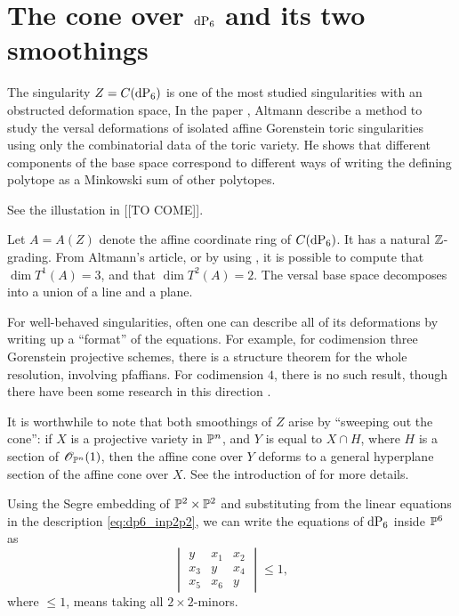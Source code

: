 \section{The cone over \texorpdfstring{$\dP6$}{dP6} and its two smoothings}

The singularity $Z=C(\dP6)$ is one of the most studied singularities with an obstructed deformation space, In the paper \cite{altmann_versaldeformation}, Altmann describe a method to study the versal deformations of isolated affine Gorenstein toric singularities using only the combinatorial data of the toric variety. He shows that different components of the base space correspond to different ways of writing the defining polytope as a Minkowski sum of other polytopes.

See the illustation in [[TO COME]].


Let $A=A(Z)$ denote the affine coordinate ring of $C(\dP6)$. It has a natural $\Z$-grading. From Altmann's article, or by using \MM, it is possible to compute that $\dim T^1(A)=3$, and that $\dim T^2(A)=2$. The versal base space decomposes into a union of a line and a plane.

For well-behaved singularities, often one can describe all of its deformations by writing up a ``format'' of the equations. For example, for codimension three Gorenstein projective schemes, there is a structure theorem for the whole resolution, involving pfaffians. For codimension $4$, there is no such result, though there have been some research in this direction .

It is worthwhile to note that both smoothings of $Z$ arise by ``sweeping out the cone'': if $X$ is a projective variety in $\P^n$, and $Y$ is equal to $X \cap H$, where $H$ is a section of $\OO_{\P^n}(1)$, then the affine cone over $Y$ deforms to a general hyperplane section of the affine cone over $X$. See the introduction of \cite{stevens_deformations} for more details.

Using the Segre embedding of $\P^2 \times \P^2$ and substituting from the linear equations in the description \cref{eq:dp6_inp2p2}, we can write the equations of $\dP6$ inside $\P^6$ as
\begin{equation}
\begin{vmatrix}
y & x_1 & x_2 \\
x_3 & y & x_4 \\
x_5 & x_6 & y
\end{vmatrix} \leq 1,
\end{equation}
where $\leq 1$, means taking all $2 \times 2$-minors.

